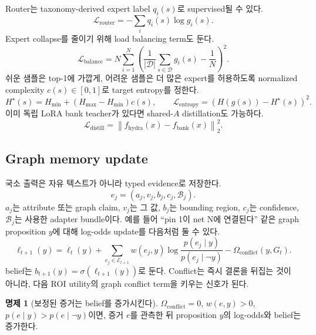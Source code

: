 \documentclass[11pt]{article}
\theoremstyle{definition}
\newtheorem{proposition}{명제}
\begin{document}
Router는 taxonomy-derived expert label $q_i(s)$로 supervised될 수 있다.
\begin{equation}
  \mathcal{L}_{\mathrm{router}}
  =
  -\sum_i q_i(s)\log g_i(s).
\end{equation}
Expert collapse를 줄이기 위해 load balancing term도 둔다.
\begin{equation}
  \mathcal{L}_{\mathrm{balance}}
  =
  N\sum_{i=1}^{N}
  \left(\frac{1}{|\mathcal{D}|}\sum_{s\in\mathcal{D}}g_i(s)-\frac{1}{N}\right)^2.
\end{equation}
쉬운 샘플은 top-1에 가깝게, 어려운 샘플은 더 많은 expert를 허용하도록 normalized complexity $c(s)\in[0,1]$로 target entropy를 정한다.
\begin{equation}
  H^\star(s)=H_{\min}+(H_{\max}-H_{\min})c(s),
  \qquad
  \mathcal{L}_{\mathrm{entropy}}=(H(g(s))-H^\star(s))^2.
\end{equation}
이미 독립 LoRA bank teacher가 있다면 shared-$A$ distillation도 가능하다.
\begin{equation}
  \mathcal{L}_{\mathrm{distill}}
  =
  \left\|
  f_{\mathrm{hydra}}(x)-f_{\mathrm{bank}}(x)
  \right\|_2^2.
\end{equation}

\subsection{Graph memory update}

국소 출력은 자유 텍스트가 아니라 typed evidence로 저장한다.
\begin{equation}
  e_j=(a_j,v_j,b_j,c_j,\mathcal{B}_j).
\end{equation}
$a_j$는 attribute 또는 graph claim, $v_j$는 그 값, $b_j$는 bounding region, $c_j$는 confidence, $\mathcal{B}_j$는 사용한 adapter bundle이다.
예를 들어 ``pin 1이 net N에 연결된다'' 같은 graph proposition $y$에 대해 log-odds update를 다음처럼 둘 수 있다.
\begin{equation}
  \ell_{t+1}(y)
  =
  \ell_t(y)
  +
  \sum_{e_j\in\mathcal{E}_{t+1}}
  w(e_j,y)
  \log
  \frac{p(e_j\mid y)}{p(e_j\mid \neg y)}
  -
  \Omega_{\mathrm{conflict}}(y,G_t).
  \label{eq:graph-update-ko}
\end{equation}
belief는 $b_{t+1}(y)=\sigma(\ell_{t+1}(y))$로 둔다.
Conflict는 즉시 결론을 뒤집는 것이 아니라, 다음 ROI utility의 graph conflict term을 키우는 신호가 된다.

\begin{proposition}[보정된 증거는 belief를 증가시킨다]
$\Omega_{\mathrm{conflict}}=0$, $w(e,y)>0$, $p(e\mid y)>p(e\mid\neg y)$이면, 증거 $e$를 관측한 뒤 proposition $y$의 log-odds와 belief는 증가한다.
\end{proposition}
\end{document}
